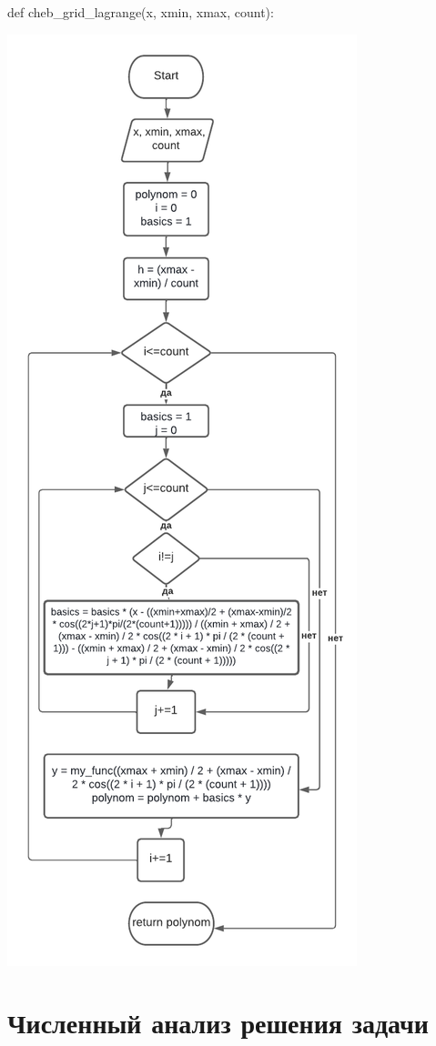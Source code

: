 def cheb\_grid\_lagrange(x, xmin, xmax, count):

\includegraphics[scale=0.75]{block4.pdf}



\section{Численный анализ решения задачи}

